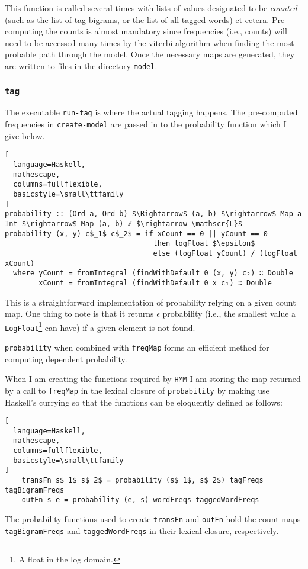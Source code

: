 \documentclass{article}
\begin{document}
This function is called several times with lists of values designated to be
\emph{counted} (such as the list of tag bigrams, or the list of all tagged words)
et cetera. Pre-computing the counts is almost mandatory since frequencies (i.e.,
counts) will need to be accessed many times by the viterbi algorithm when
finding the most probable path through the model. Once the necessary maps are
generated, they are written to files in the directory \texttt{model}.

\subsubsection{\texttt{tag}}
\label{par:tag}

The executable \texttt{run-tag} is where the actual tagging happens. The
pre-computed frequencies  in \texttt{create-model} are passed in to the
probability function which I give below.
\begin{lstlisting}[
  language=Haskell,
  mathescape,
  columns=fullflexible,
  basicstyle=\small\ttfamily
]
probability :: (Ord a, Ord b) $\Rightarrow$ (a, b) $\rightarrow$ Map a Int $\rightarrow$ Map (a, b) ℤ $\rightarrow \mathscr{L}$
probability (x, y) c$_1$ c$_2$ = if xCount == 0 || yCount == 0
                                   then logFloat $\epsilon$
                                   else (logFloat yCount) / (logFloat xCount)
  where yCount = fromIntegral (findWithDefault 0 (x, y) c₂) ∷ Double
        xCount = fromIntegral (findWithDefault 0 x c₁) ∷ Double
\end{lstlisting}
This is a straightforward implementation of probability relying on a given count
map. One thing to note is that it returns $\epsilon$ probability (i.e., the
smallest value a \texttt{LogFloat}\footnote{A float in the log domain.} can have) if a given element is not found.

\texttt{probability} when combined with \texttt{freqMap} forms an efficient
method for computing dependent probability.

When I am creating the functions required by \texttt{HMM} I am storing the
map returned by a call to \texttt{freqMap} in the lexical closure of
\texttt{probability} by making use Haskell's currying so that the functions can
be eloquently defined as follows:
\begin{lstlisting}[
  language=Haskell,
  mathescape,
  columns=fullflexible,
  basicstyle=\small\ttfamily
]
    transFn s$_1$ s$_2$ = probability (s$_1$, s$_2$) tagFreqs tagBigramFreqs
    outFn s e = probability (e, s) wordFreqs taggedWordFreqs
\end{lstlisting}
The probability functions used to create \texttt{transFn} and \texttt{outFn}
hold the count maps \texttt{tagBigramFreqs} and \texttt{taggedWordFreqs} in
their lexical closure, respectively.
\end{document}
